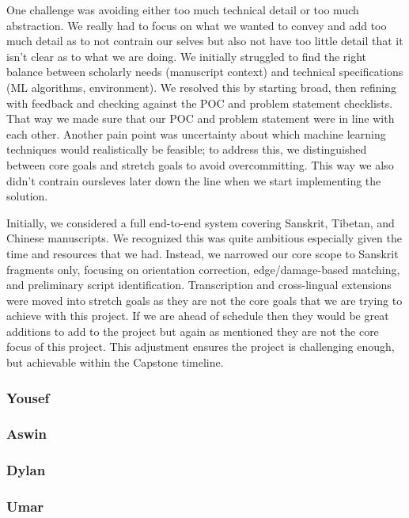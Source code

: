 \documentclass{article}
\begin{document}
\hspace{2em} One challenge was avoiding either too much technical detail or too much abstraction. We really had to focus on what we wanted to convey and add too much detail as to not contrain our selves but also not have too little detail that it isn't clear as to what we are doing. We initially struggled to find the right balance between scholarly needs (manuscript context) and technical specifications (ML algorithms, environment). We resolved this by starting broad, then refining with feedback and checking against the POC and problem statement checklists. That way we made sure that our POC and problem statement were in line with each other. Another pain point was uncertainty about which machine learning techniques would realistically be feasible; to address this, we distinguished between core goals and stretch goals to avoid overcommitting. This way we also didn't contrain oursleves later down the line when we start implementing the solution.

\hspace{2em} Initially, we considered a full end-to-end system covering Sanskrit, Tibetan, and Chinese manuscripts. We recognized this was quite ambitious especially given the time and resources that we had. Instead, we narrowed our core scope to Sanskrit fragments only, focusing on orientation correction, edge/damage-based matching, and preliminary script identification. Transcription and cross-lingual extensions were moved into stretch goals as they are not the core goals that we are trying to achieve with this project. If we are ahead of schedule then they would be great additions to add to the project but again as mentioned they are not the core focus of this project. This adjustment ensures the project is challenging enough, but achievable within the Capstone timeline.


\vspace{0.5cm}

\subsubsection*{Yousef}

\vspace{0.5cm}

\subsubsection*{Aswin}

\vspace{0.5cm}

\subsubsection*{Dylan}

\vspace{0.5cm}

\subsubsection*{Umar}
\end{document}
